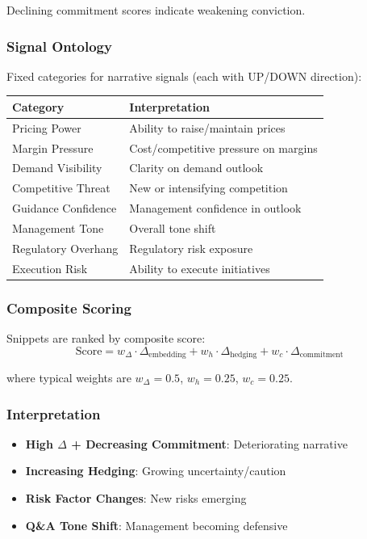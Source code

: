 Declining commitment scores indicate weakening conviction.

\subsubsection{Signal Ontology}

Fixed categories for narrative signals (each with UP/DOWN direction):

\begin{center}
\begin{tabular}{ll}
\textbf{Category} & \textbf{Interpretation} \\
\hline
Pricing Power & Ability to raise/maintain prices \\
Margin Pressure & Cost/competitive pressure on margins \\
Demand Visibility & Clarity on demand outlook \\
Competitive Threat & New or intensifying competition \\
Guidance Confidence & Management confidence in outlook \\
Management Tone & Overall tone shift \\
Regulatory Overhang & Regulatory risk exposure \\
Execution Risk & Ability to execute initiatives \\
\end{tabular}
\end{center}

\subsubsection{Composite Scoring}

Snippets are ranked by composite score:
\[
\text{Score} = w_{\Delta} \cdot \Delta_{\text{embedding}} + w_h \cdot \Delta_{\text{hedging}} + w_c \cdot \Delta_{\text{commitment}}
\]

where typical weights are $w_{\Delta} = 0.5$, $w_h = 0.25$, $w_c = 0.25$.

\subsubsection{Interpretation}

\begin{itemize}
  \item \textbf{High $\Delta$ + Decreasing Commitment}: Deteriorating narrative
  \item \textbf{Increasing Hedging}: Growing uncertainty/caution
  \item \textbf{Risk Factor Changes}: New risks emerging
  \item \textbf{Q\&A Tone Shift}: Management becoming defensive
\end{itemize}

